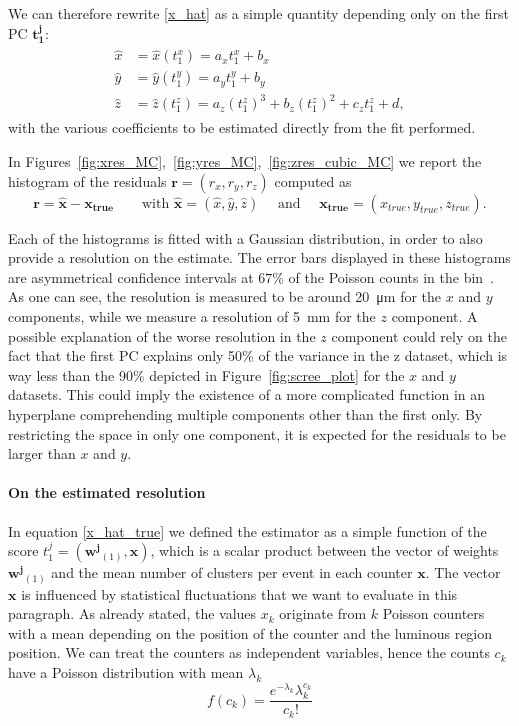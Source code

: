 We can therefore rewrite \eqref{x_hat} as a simple quantity depending only on the first PC $\mathbf{t^j_1}$:
\begin{align}
\begin{split}
    \hat{x} &= \hat{x}(t^x_1) = a_x t^x_1 + b_x \\
    \hat{y} &= \hat{y}(t^y_1) = a_y t^y_1 + b_y \\\label{x_hat_true}
    \hat{z} &= \hat{z}(t^z_1) = a_z (t^z_1)^3 + b_z (t^z_1)^2 + c_z  t^z_1 + d,
    \end{split}
\end{align} 
with the various coefficients to be estimated directly from the fit performed. 

In Figures~\ref{fig:xres_MC},~\ref{fig:yres_MC},~\ref{fig:zres_cubic_MC} we report the histogram of the residuals $\mathbf{r}=(r_x, r_y, r_z)$ computed as 
 \begin{equation}
     \mathbf{r}=\hat{\mathbf{x}} - \mathbf{x_{true}} \qquad \text{with } \hat{\mathbf{x}} = (\hat{x}, \hat{y}, \hat{z}) \quad \text{ and } \quad \mathbf{x_{true}}=(x_{true}, y_{true}, z_{true}).
 \end{equation}

 Each of the histograms is fitted with a Gaussian distribution, in order to also provide a resolution on the estimate. The error bars displayed in these histograms are asymmetrical confidence intervals at $67$\% of the Poisson counts in the bin~\cite{c91e9970-216b-3ca1-adc9-c0f78fd16662}.
 As one can see, the resolution is measured to be around \SI{20}{\micro\meter} for the $x$ and $y$ components, while we measure a resolution of \SI{5}{\milli\meter} for the $z$ component. A possible explanation of the worse resolution in the $z$ component could rely on the fact that the first PC explains only 50\% of the variance in the z dataset, which is way less than the 90\% depicted in Figure~\ref{fig:scree_plot} for the $x$ and $y$ datasets. This could imply the existence of a more complicated function in an hyperplane comprehending multiple components other than the first only. By restricting the space in only one component, it is expected for the residuals to be larger than $x$ and $y$.
 
 \paragraph{On the estimated resolution}
 In equation \eqref{x_hat_true} we defined the estimator as a simple function of the score $t^j_1=(\mathbf{w^j}_{(1)},\mathbf{x})$, which is a scalar product between the vector of weights $\mathbf{w^j}_{(1)}$ and the mean number of clusters per event in each counter $\mathbf{x}$. The vector $\mathbf{x}$ is influenced by statistical fluctuations that we want to evaluate in this paragraph. As already stated, the values $x_k$ originate from $k$ Poisson counters with a mean depending on the position of the counter and the luminous region position. We can treat the counters as independent variables, hence the counts $c_k$ have a Poisson distribution with mean $\lambda_k$
 \begin{equation}
     f(c_k) = \frac{e^{-\lambda_k} \lambda_k^{c_k}}{c_k!}
 \end{equation}

